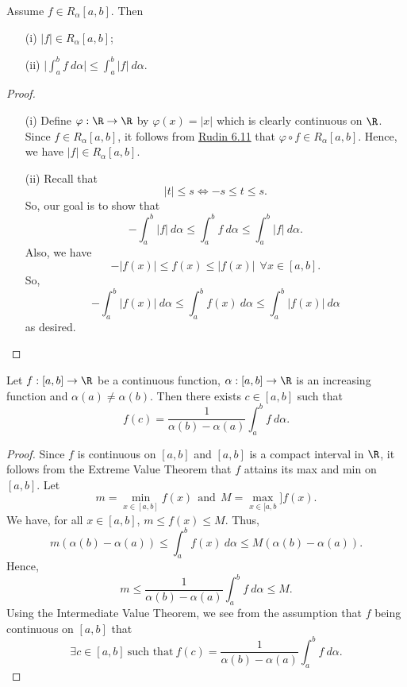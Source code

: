 \begin{theorem}
    Assume \( f \in {R}_{\alpha}[a,b] \). Then
    \begin{enumerate}
        \item[(i)] \( | f |  \in {R}_{\alpha}[a,b] \);
        \item[(ii)] \( \displaystyle \Big| \int_{ a }^{ b }  f  \ d \alpha \Big|  \leq \int_{ a }^{ b }  | f |  \ d \alpha \).
    \end{enumerate}
\end{theorem}
\begin{proof}
\begin{enumerate}
    \item[(i)] Define \( \varphi: \R \to \R  \) by \( \varphi(x) = | x  |  \) which is clearly continuous on \( \R  \). Since \( f \in {R}_{\alpha}[a,b] \), it follows from {\hyperref[Rudin 6.11]{Rudin 6.11}} that \( \varphi \circ f \in {R}_{\alpha}[a,b] \). Hence, we have \( | f |  \in {R}_{\alpha}[a,b]  \).  
    \item[(ii)] Recall that 
        \[  | t  |  \leq s \iff - s \leq t \leq s.  \]
        So, our goal is to show that 
        \[ - \int_{ a }^{ b }  | f  |  \ d \alpha \leq \int_{ a }^{ b }  f  \ d \alpha \leq \int_{ a }^{ b }  | f  |  \ d \alpha. \]
        Also, we have 
        \[ - | f(x) |  \leq f(x) \leq | f(x) |  \ \ \forall x \in [a,b].  \]
        So, 
        \[  -\int_{ a }^{ b }  | f(x) |  \ d \alpha \leq \int_{ a }^{ b }  f(x) \ d \alpha \leq \int_{ a }^{ b }  | f(x) |  \ d \alpha \]
        as desired.
\end{enumerate}
\end{proof}

\begin{theorem}
    Let \( f:[a,b] \to \R  \) be a continuous function, \( \alpha:[a,b] \to \R  \) is an increasing function and \( \alpha(a) \neq \alpha(b) \). Then there exists \( c \in [a,b] \) such that 
    \[  f(c) = \frac{ 1 }{  \alpha(b) - \alpha(a) }   \int_{ a }^{ b }  f  \ d \alpha. \]
\end{theorem}
\begin{proof}
    Since \( f  \) is continuous on \( [a,b] \) and \( [a,b] \) is a compact interval in \( \R  \), it follows from the Extreme Value Theorem that \( f  \) attains its max and min on \( [a,b] \). Let 
    \[  m = \min_{x \in [a,b]} f(x) \ \ \text{and} \ \ M = \max_{x \in [a,b}] f(x). \]
    We have, for all \( x \in [a,b] \), \( m \leq f(x) \leq M  \). Thus, 
    \[  m(\alpha(b) - \alpha(a)) \leq \int_{ a }^{ b }  f(x) \ d \alpha \leq M(\alpha(b) - \alpha(a)).\]
    Hence, 
    \[  m \leq \frac{ 1 }{  \alpha(b) - \alpha(a)  }  \int_{ a }^{ b }  f  \ d \alpha \leq M.  \]
    Using the Intermediate Value Theorem, we see from the assumption that \( f  \) being continuous on \( [a,b]  \) that
    \[  \exists c \in [a,b] \ \text{such that} \ f(c) = \frac{ 1 }{ \alpha(b) - \alpha(a) } \int_{ a }^{ b }  f \ d \alpha. \]
\end{proof}

